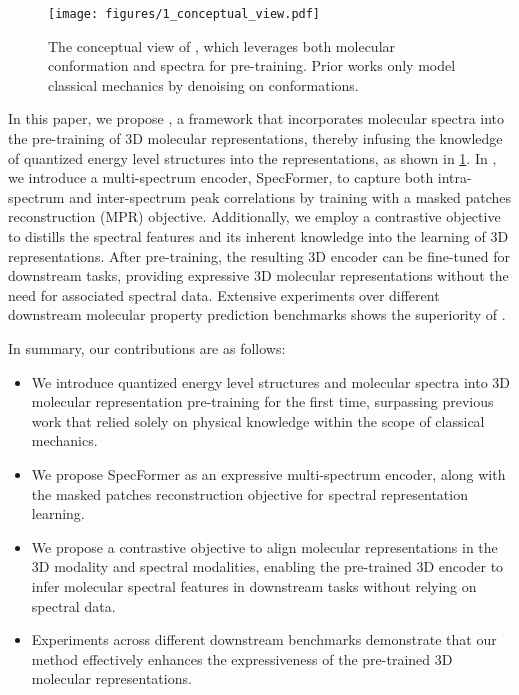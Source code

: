 \begin{figure}
\begin{center}
\texttt{[image: figures/1\_conceptual\_view.pdf]}
\end{center}
\caption{
The conceptual view of \themodel, which leverages both molecular conformation and spectra for pre-training.
Prior works only model classical mechanics by denoising on conformations.
}
\label{fig:principle}
\end{figure}

In this paper, we propose \themodel, a framework that incorporates molecular spectra into the pre-training of 3D molecular representations, 
thereby infusing the knowledge of quantized energy level structures into the representations, as shown in \cref{fig:principle}. 
In \themodel, we introduce a multi-spectrum encoder, SpecFormer, to capture both intra-spectrum and inter-spectrum peak correlations by training with a masked patches reconstruction (MPR) objective. 
Additionally, we employ a contrastive objective to distills the spectral features and its inherent knowledge into the learning of 3D representations. 
After pre-training, the resulting 3D encoder can be fine-tuned for downstream tasks, providing expressive 3D molecular representations without the need for associated spectral data.
Extensive experiments over different downstream molecular property prediction benchmarks shows the superiority of \themodel.

In summary, our contributions are as follows:
\begin{itemize}[leftmargin=*]
    \item We introduce quantized energy level structures and molecular spectra into 3D molecular representation pre-training for the first time, surpassing previous work that relied solely on physical knowledge within the scope of classical mechanics.
    \item We propose SpecFormer as an expressive multi-spectrum encoder, along with the masked patches reconstruction objective for spectral representation learning.
    \item We propose a contrastive objective to align molecular representations in the 3D modality and spectral modalities, enabling the pre-trained 3D encoder to infer molecular spectral features in downstream tasks without relying on spectral data.
    \item Experiments across different downstream benchmarks demonstrate that our method effectively enhances the expressiveness of the pre-trained 3D molecular representations.
\end{itemize}